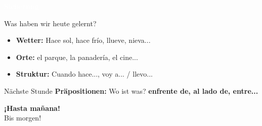 \documentclass[aspectratio=169,11pt]{beamer}
\newcommand{\es}[1]{\textcolor{spanisch}{\textbf{#1}}}
\newcommand{\phase}[1]{\begin{center}\colorbox{spanisch}{\textcolor{white}{\large\bfseries #1}}\end{center}}
\begin{document}

\begin{frame}{}
\phase{Sicherung}
\end{frame}

\begin{frame}{Was haben wir heute gelernt?}
\begin{itemize}
\setlength\itemsep{1em}
\item[\textcolor{spanisch}{\checkmark}] \textbf{Wetter:} Hace sol, hace frío, llueve, nieva...
\item[\textcolor{spanisch}{\checkmark}] \textbf{Orte:} el parque, la panadería, el cine...
\item[\textcolor{spanisch}{\checkmark}] \textbf{Struktur:} Cuando hace..., voy a... / llevo...
\end{itemize}

\vspace{1cm}

\begin{block}{Nächste Stunde}
\textbf{Präpositionen:} Wo ist was? \es{enfrente de, al lado de, entre...}
\end{block}
\end{frame}

\begin{frame}{}
\begin{center}
{\Huge\bfseries\textcolor{spanisch}{¡Hasta mañana!}}\\[1cm]
{\Large Bis morgen!}
\end{center}
\end{frame}
\end{document}
